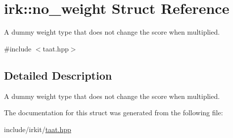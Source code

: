 \hypertarget{structirk_1_1no__weight}{}\section{irk\+:\+:no\+\_\+weight Struct Reference}
\label{structirk_1_1no__weight}


A dummy weight type that does not change the score when multiplied.  




{\ttfamily \#include $<$taat.\+hpp$>$}



\subsection{Detailed Description}
A dummy weight type that does not change the score when multiplied. 

The documentation for this struct was generated from the following file\+:\begin{DoxyCompactItemize}
\item 
include/irkit/\mbox{\hyperlink{taat_8hpp}{taat.\+hpp}}\end{DoxyCompactItemize}
